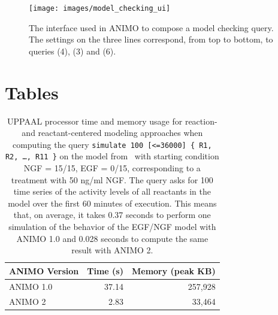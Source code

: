 \documentclass{bmcart}
\def\animo2{ANIMO 2}
\begin{document}
\begin{backmatter}
\begin{figure}[htb]
  \begin{center}
    \texttt{[image: images/model\_checking\_ui]}
  \end{center}
  \caption{The interface used in ANIMO to compose a model checking query.
  The settings on the three lines correspond, from top to bottom,
  to queries (4), (3) and (6).\label{fig:model-checking-ui}}
\end{figure}




\clearpage
\section*{Tables}



\begin{table}[h!]
\scriptsize
  \begin{center}
  \begin{tabular}{|l||r|r|}
    \hline
    ANIMO Version & Time (s) & Memory (peak KB) \\
    \hline
    \hline
    ANIMO 1.0 & 37.14 & 257,928 \\
    \hline
    \animo2{} & 2.83 & 33,464 \\
    \hline
  \end{tabular}
  \end{center}
  \caption{UPPAAL processor time and memory usage for reaction- and reactant-centered modeling approaches when computing
  the query {\tt simulate 100 [<=36000] \{ R1, R2, \dots, R11 \}} on the model from~\cite{animo-bibe} with starting condition
  NGF = 15/15, EGF = 0/15, corresponding to a treatment with 50 ng/ml NGF.
  The query asks for 100 time series of the activity levels of all reactants in the model over the first 60 minutes
  of execution. This means that, on average, it takes 0.37 seconds to perform one simulation of the behavior
  of the EGF/NGF model with ANIMO 1.0 and 0.028 seconds to compute the same result with \animo2{}.\label{tab:sim-100}}
\end{table}


\end{backmatter}
\end{document}
